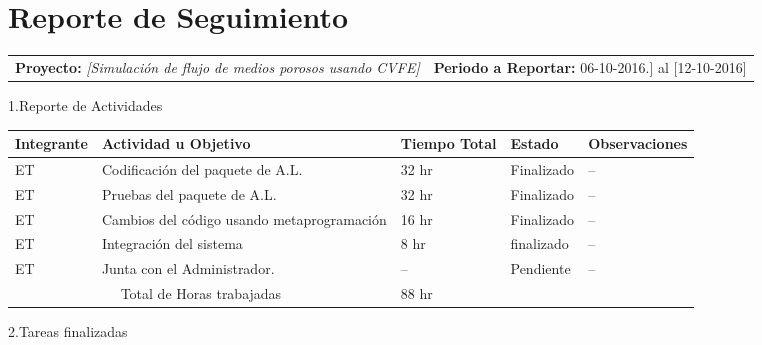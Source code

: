 \documentclass[12pt]{report}
\numberwithin{equation}{section}
\begin{document}
\centering \section{Reporte de Seguimiento} 

\begin{flushleft}

\begin{tabular}{m{7cm} m{8cm}}
\small{ \textbf{Proyecto:}} \scriptsize{\textit{[Simulaci\'on de flujo de medios porosos usando CVFE]}} & \small{\textbf{Periodo a Reportar:}} \scriptsize{06-10-2016.] al [12-10-2016]}
\end{tabular}



\large{1.Reporte de Actividades }\\


\begin{table}[H]
\begin{tabular}{|m{2cm}|m{4.5cm}|m{1.5cm}|m{1.5cm}|m{4.5cm}|}
\hline
\small{\textbf{Integrante}} &\small{ \textbf{Actividad u Objetivo}} &\small{ \textbf{Tiempo Total}} & \small{\textbf{Estado} }& \small{\textbf{Observaciones}}\\
\hline \hline
ET & Codificaci\'on del paquete de A.L.  & 32 hr & Finalizado & \small{--}\\
\hline
ET & Pruebas del paquete de A.L.  & 32 hr & Finalizado & \small{--}\\
\hline
ET & Cambios del código usando metaprogramaci\'on  & 16 hr & Finalizado & \small{--}\\
\hline
ET & Integraci\'on del sistema  & 8 hr & finalizado & \small{--}\\
\hline
ET & Junta con el Administrador.  & -- & Pendiente & \small{--}\\
\hline
\multicolumn{2}{|c|}{Total de Horas trabajadas} & 88 hr  & & \\
\hline 
\end{tabular}
\label{tabla: TABLA CE Actividades}
\end{table}


\large{2.Tareas finalizadas }\\


\end{flushleft}
\end{document}
